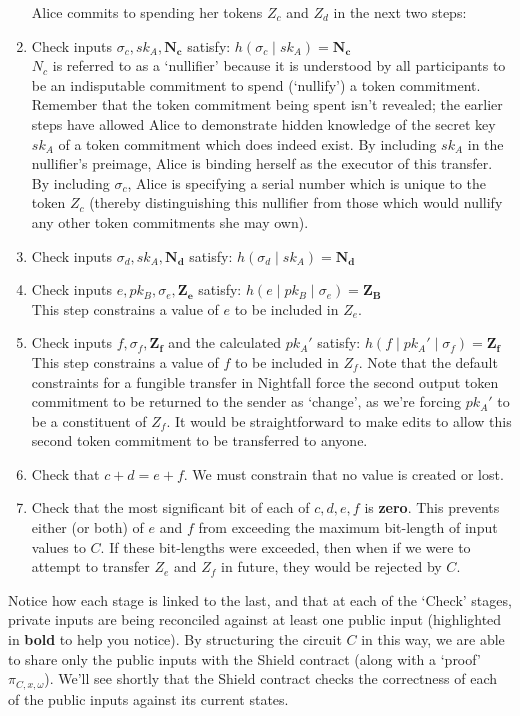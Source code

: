 \documentclass{article}
\begin{document}
\begin{enumerate}
  Alice commits to spending her tokens $Z_c$ and $Z_d$ in the next two steps:
  \item Check inputs $\sigma_c, sk_A, \bm{N_c}$ satisfy:
    $h(\sigma_c\;|\;sk_A) = \bm{N_c}$\\
    $N_c$ is referred to as a `nullifier' because it is understood by all participants to be an indisputable commitment to spend (`nullify') a token commitment. Remember that the token commitment being spent isn't revealed; the earlier steps have allowed Alice to demonstrate hidden knowledge of the secret key $sk_A$ of a token commitment which does indeed exist. By including $sk_A$ in the nullifier's preimage, Alice is binding herself as the executor of this transfer. By including $\sigma_c$, Alice is specifying a serial number which is unique to the token $Z_c$ (thereby distinguishing this nullifier from those which would nullify any other token commitments she may own).\\
  \item Check inputs $\sigma_d, sk_A, \bm{N_d}$ satisfy:
    $h(\sigma_d\;|\;sk_A) = \bm{N_d}$\\
  \item Check inputs $e, pk_B, \sigma_e, \bm{Z_e}$ satisfy:
    $h(e\;|\;pk_B\;|\;\sigma_e) = \bm{Z_B}$\\
    This step constrains a value of $e$ to be included in $Z_e$.
  \item Check inputs $f, \sigma_f, \bm{Z_f}$ and the calculated $pk_A'$ satisfy:
    $h(f\;|\;pk_A'\;|\;\sigma_f) = \bm{Z_f}$\\
    This step constrains a value of $f$ to be included in $Z_f$. Note that the default constraints for a fungible transfer in Nightfall force the second output token commitment to be returned to the sender as `change', as we're forcing $pk_A'$ to be a constituent of $Z_f$. It would be straightforward to make edits to allow this second token commitment to be transferred to anyone.
  \item Check that $c + d \bm{=} e + f$. We must constrain that no value is created or lost.
  \item Check that the most significant bit of each of $c, d, e, f$ is \textbf{zero}. This prevents either (or both) of $e$ and $f$ from exceeding the maximum bit-length of input values to $C$. If these bit-lengths were exceeded, then when if we were to attempt to transfer $Z_e$ and $Z_f$ in future, they would be rejected by $C$.

\end{enumerate}
Notice how each stage is linked to the last, and that at each of the `Check' stages, private inputs are being reconciled against at least one public input (highlighted in \textbf{bold} to help you notice). By structuring the circuit $C$ in this way, we are able to share only the public inputs with the Shield contract (along with a `proof' $\pi_{C,x,\omega}$). We'll see shortly that the Shield contract checks the correctness of each of the public inputs against its current states.\\
\\
\end{document}
